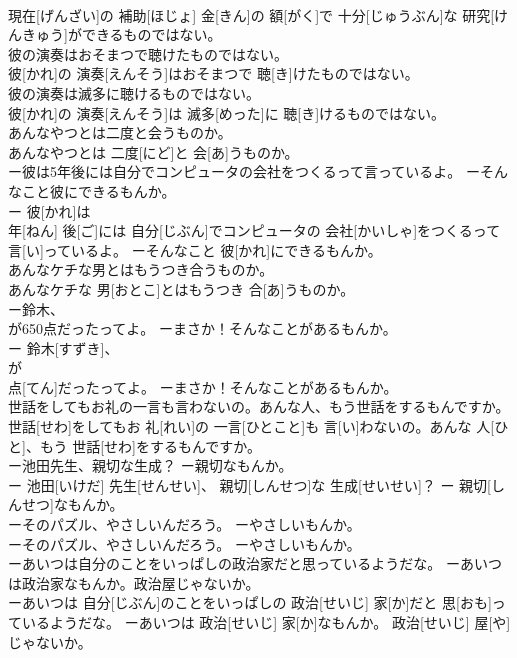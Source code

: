 \documentclass[8pt]{extreport}
\begin{document}
\begin{CJK}{UTF8}{min}
\\	現在[げんざい]の 補助[ほじょ] 金[きん]の 額[がく]で 十分[じゅうぶん]な 研究[けんきゅう]ができるものではない。
\\	彼の演奏はおそまつで聴けたものではない。	
\\	彼[かれ]の 演奏[えんそう]はおそまつで 聴[き]けたものではない。
\\	彼の演奏は滅多に聴けるものではない。	
\\	彼[かれ]の 演奏[えんそう]は 滅多[めった]に 聴[き]けるものではない。
\\	あんなやつとは二度と会うものか。	
\\	あんなやつとは 二度[にど]と 会[あ]うものか。
\\	ー彼は5年後には自分でコンピュータの会社をつくるって言っているよ。 ーそんなこと彼にできるもんか。	
\\	ー 彼[かれ]は 
\\	年[ねん] 後[ご]には 自分[じぶん]でコンピュータの 会社[かいしゃ]をつくるって 言[い]っているよ。 ーそんなこと 彼[かれ]にできるもんか。
\\	あんなケチな男とはもうつき合うものか。	
\\	あんなケチな 男[おとこ]とはもうつき 合[あ]うものか。
\\	ー鈴木、
\\	が650点だったってよ。 ーまさか！そんなことがあるもんか。	
\\	ー 鈴木[すずき]、 
\\	が 
\\	点[てん]だったってよ。 ーまさか！そんなことがあるもんか。
\\	世話をしてもお礼の一言も言わないの。あんな人、もう世話をするもんですか。	
\\	世話[せわ]をしてもお 礼[れい]の 一言[ひとこと]も 言[い]わないの。あんな 人[ひと]、もう 世話[せわ]をするもんですか。
\\	ー池田先生、親切な生成？ ー親切なもんか。	
\\	ー 池田[いけだ] 先生[せんせい]、 親切[しんせつ]な 生成[せいせい]？ ー 親切[しんせつ]なもんか。
\\	ーそのパズル、やさしいんだろう。 ーやさしいもんか。	
\\	ーそのパズル、やさしいんだろう。 ーやさしいもんか。
\\	ーあいつは自分のことをいっぱしの政治家だと思っているようだな。 ーあいつは政治家なもんか。政治屋じゃないか。	
\\	ーあいつは 自分[じぶん]のことをいっぱしの 政治[せいじ] 家[か]だと 思[おも]っているようだな。 ーあいつは 政治[せいじ] 家[か]なもんか。 政治[せいじ] 屋[や]じゃないか。

\end{CJK}
\end{document}
